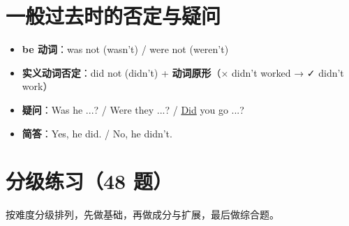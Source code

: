 \documentclass[11pt,a4paper]{ctexart}
\begin{document}
\section{一般过去时的否定与疑问}
\begin{itemize}[leftmargin=1.4em]
\item \textbf{be 动词}：was not (wasn't) / were not (weren't)
\item \textbf{实义动词否定}：did not (didn't) + \textbf{动词原形}（× didn't worked → ✓ didn't work）
\item \textbf{疑问}：Was he ...? / Were they ...? / \underline{Did} you go ...?
\item \textbf{简答}：Yes, he did. / No, he didn't.
\end{itemize}


\newpage
\section{分级练习（48 题）}
\noindent 按难度分级排列，先做基础，再做成分与扩展，最后做综合题。
\end{document}
